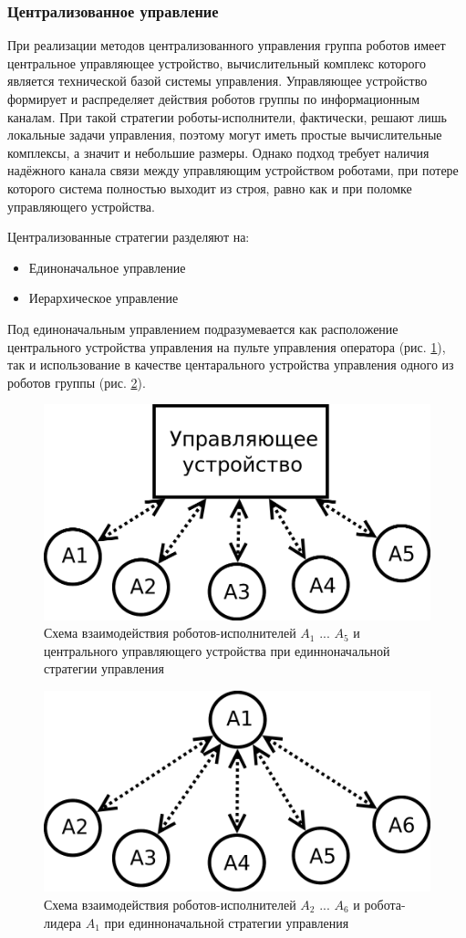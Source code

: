 \documentclass[a4paper, 14pt]{extarticle}
\begin{document}
\subsubsection{Централизованное управление}
При
реализации
методов
централизованного управления группа роботов имеет центральное управляющее устройство,
вычислительный комплекс которого является технической базой системы
управления. Управляющее устройство формирует и распределяет действия роботов группы по информационным каналам. При такой стратегии роботы-исполнители, фактически, решают лишь локальные
задачи управления, поэтому могут иметь простые вычислительные комплексы, а значит и небольшие размеры. Однако подход требует наличия надёжного канала связи между управляющим устройством роботами, при потере которого система полностью выходит из строя, равно как и при поломке управляющего устройства. \par
Централизованные стратегии разделяют на:
\begin{itemize}
	\item Единоначальное управление
	\item Иерархическое управление
\end{itemize}
Под единоначальным управлением подразумевается как расположение центрального устройства управления на пульте управления оператора (рис. \ref{fig:centr-platoon-controll}), так и использование в качестве центарального устройства управления одного из роботов группы (рис. \ref{fig:centr-platoon-agent}). 
\begin{figure}[!htbp]
	\centering
	\includegraphics[width=0.7\linewidth]{others/centr-platoon-controll}
	\caption{Схема взаимодействия роботов-исполнителей $A_1$ ... $A_5$ и центрального управляющего устройства при единноначальной стратегии управления}
	\label{fig:centr-platoon-controll}
\end{figure}
\begin{figure}[!htbp]
	\centering
	\includegraphics[width=0.7\linewidth]{others/centr-platoon-agent}
	\caption{Схема взаимодействия роботов-исполнителей $A_2$ ... $A_6$ и робота-лидера $A_1$ при единноначальной стратегии управления}
	\label{fig:centr-platoon-agent}
\end{figure}
\end{document}
